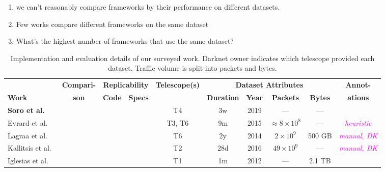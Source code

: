 \documentclass[manuscript,nonacm]{acmart}
\newcommand{\cmark}{\ding{51}}%
\newcommand{\xmark}{\ding{55}}%
\newcommand{\wc}[1]{\textit{\textcolor{magenta}{#1}}} %
\begin{document}
\begin{enumerate}
	\item we can't reasonably compare frameworks by their performance on different datasets.
	\item Few works compare different frameworks on the same dataset
	\item What's the highest number of frameworks that use the same dataset?
\end{enumerate}

\begin{table*}[h!]
    \small
    \setlength{\tabcolsep}{4pt}
	\caption{Implementation and evaluation details of our surveyed work. Darknet owner indicates which telescope provided each dataset. Traffic volume is split into packets and bytes.}
    \label{tab:eval}
    \begin{tabular}{@{}lccccccccc@{}}
        \toprule
        & \multicolumn{1}{c}{\textbf{Compari-}} 
        & \multicolumn{2}{c}{\bf Replicability} 
        & \multicolumn{1}{c}{\textbf{Telescope(s)}} 
        & \multicolumn{4}{c}{\bf Dataset Attributes} 
        & \multicolumn{1}{c}{\textbf{Annot-}} \\
        \cmidrule(lr){3-4} \cmidrule(lr){6-9}
        \textbf{Work} & \textbf{son} & \textbf{Code} & \textbf{Specs} &  & \textbf{Duration} & \textbf{Year} & \textbf{Packets} & \textbf{Bytes} & \textbf{ations} \\
        \midrule
        \textbf{Soro et al.~\cite{2020soro}}
        & \xmark
        & \xmark & \xmark
        & T4
        & 3w & 2019
        & --- & ---
        & \xmark \\

        Evrard et al.~\cite{2019evrard}
        & \xmark
        & \xmark & \xmark
        & T3, T6
        & 9m & 2015
        & ${\approx}8\times10^{8}$ & ---
        & \wc{heuristic} \\

        Lagraa et al.~\cite{2017lagraa,2019lagraa}
        & \xmark
        & \xmark & \cmark
        & T6
        & 2y & 2014
        & $2\times10^{9}$ & 500 GB
        & \wc{manual, DK} \\

        Kallitsis et al.~\cite{2022kallitsis}
        & \cmark~\cite{2021gioacchini}
        & \cmark & \cmark
        & T2
        & 28d & 2016
        & $49\times10^{9}$ & ---
        & \wc{manual, DK} \\

        Iglesias et al.~\cite{2019iglesias}
        & \xmark
        & \xmark & \cmark
        & T1
        & 1m & 2012
        & --- & 2.1 TB
        & \xmark \\


\end{tabular}
\end{table*}
\end{document}
